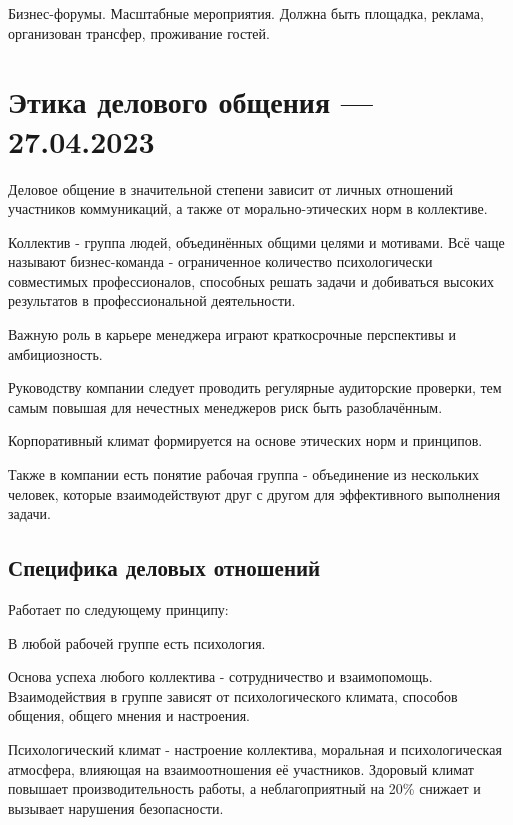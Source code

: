 \documentclass[a4paper,14pt]{extarticle}
\begin{document}
Бизнес-форумы. Масштабные мероприятия. Должна быть площадка, реклама, организован трансфер, проживание гостей.

\section{Этика делового общения — 27.04.2023}

Деловое общение в значительной степени зависит от личных отношений участников коммуникаций, а также от морально-этических норм в коллективе.

Коллектив - группа людей, объединённых общими целями и мотивами. Всё чаще называют бизнес-команда - ограниченное количество психологически совместимых профессионалов, способных решать задачи и добиваться высоких результатов в профессиональной деятельности.

Важную роль в карьере менеджера играют краткосрочные перспективы
и амбициозность.

Руководству компании следует проводить регулярные аудиторские проверки, тем самым повышая для нечестных менеджеров риск быть разоблачённым.

Корпоративный климат формируется на основе этических норм и принципов.

Также в компании есть понятие рабочая группа - объединение из нескольких человек, которые взаимодействуют друг с другом для эффективного выполнения задачи.

\subsection{Специфика деловых отношений}

Работает по следующему принципу:

\begin{multienumerate}
\end{multienumerate}

В любой рабочей группе есть психология.

Основа успеха любого коллектива - сотрудничество и взаимопомощь. Взаимодействия в группе зависят от психологического климата, способов общения, общего мнения и настроения.

Психологический климат - настроение коллектива, моральная и психологическая атмосфера, влияющая на взаимоотношения её участников. Здоровый климат повышает производительность работы, а неблагоприятный на 20\% снижает и вызывает нарушения безопасности.
\end{document}
